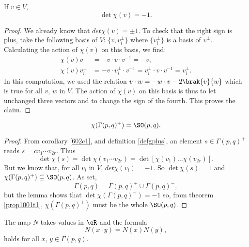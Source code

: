\begin{lemma}
If $v\in V$,
\begin{equation}
                 \det\chi(v)=-1.
\end{equation}
\end{lemma}

\begin{proof}
We already know that $det\chi(v)=\pm 1$. To check that the right sign is plus, take the following basis of $V$: $\{v,v_i^{\perp}\}$ where $\{v_i^{\perp}\}$ is a basis of $v^{\perp}$. Calculating the action of $\chi(v)$ on this basis, we find:
\begin{equation}
\begin{split}
 \chi(v)v&=-v\cdot v\cdot v^{-1}=-v,\\
 \chi(v)v_i^{\perp}&=-v\cdot v_i^{\perp}\cdot v^{-1}
                   =v_i^{\perp}\cdot v\cdot v^{-1}
                   =v_i^{\perp}.
\end{split}
\end{equation}
In this computation, we used the relation $v\cdot w=-w\cdot v-2\brak{v}{w}$ which is true for all $v$, $w$ in $V$. The action of $\chi(v)$ on this basis is thus to let unchanged three vectors and to change the sign of the fourth. This proves the claim.
\end{proof}

\begin{theorem}
\begin{equation}
                   \chi(\Gamma(p,q)^+)=\SO(p,q).
\end{equation}
\label{2102p1}
\end{theorem}

\begin{proof}
From corollary \ref{602c1}, and definition \ref{defgplus}, an element $s\in\Gamma(p,q)^+$ reads $s=cv_1\cdots v_{2r}$. Thus
\begin{equation}
 \det\chi(s)=\det\chi(v_1\cdots v_{2r})
            =\det\left[\chi(v_1)\ldots\chi(v_{2r})\right].
\end{equation}
 But we know that, for all $v_i$ in $V$, $det\chi(v_i)=-1$. So $\det\chi(s)=1$ and $\chi(\Gamma(p,q)^+)\subseteq \SO(p,q)$. As set, 
\[
  \Gamma(p,q)=\Gamma(p,q)^+\cup\Gamma(p,q)^-,
\]
but the lemma shows that $\det\chi(\Gamma(p,q)^-)=-1$ so, from theorem \ref{prop1001t1}, $\chi(\Gamma(p,q)^+)$ must be the whole $\SO(p,q)$.
\end{proof}

\begin{proposition}
The map $N$ takes values in $\eR$ and the formula
\begin{equation}
             N(x\cdot y)=N(x)N(y),
\end{equation}
holds for all $x$, $y\in\Gamma(p,q)$.
\label{proppourN}
\end{proposition}

